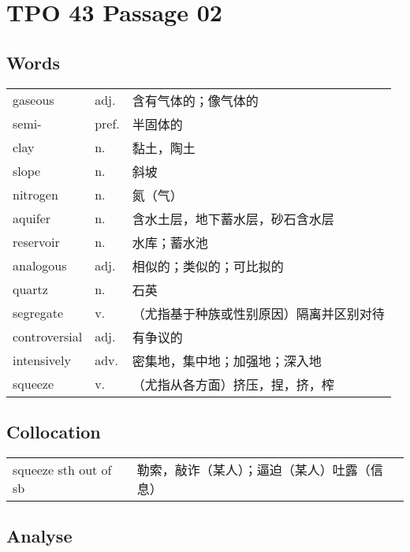 \section{TPO 43 Passage 02}

\subsection{Words}

\begin{tabular}{lll}
    gaseous       & adj.  & 含有气体的；像气体的           \\
    semi-         & pref. & 半固体的                 \\
    clay          & n.    & 黏土，陶土                \\
    slope         & n.    & 斜坡                   \\
    nitrogen      & n.    & 氮（气）                 \\
    aquifer       & n.    & 含水土层，地下蓄水层，砂石含水层     \\
    reservoir     & n.    & 水库；蓄水池               \\
    analogous     & adj.  & 相似的；类似的；可比拟的         \\
    quartz        & n.    & 石英                   \\
    segregate     & v.    & （尤指基于种族或性别原因）隔离并区别对待 \\
    controversial & adj.  & 有争议的                 \\
    intensively   & adv.  & 密集地，集中地；加强地；深入地      \\
    squeeze       & v.    & （尤指从各方面）挤压，捏，挤，榨     \\
\end{tabular}

\subsection{Collocation}

\begin{tabular}{ll}
    squeeze sth out of sb & 勒索，敲诈（某人）；逼迫（某人）吐露（信息） \\
\end{tabular}

\subsection{Analyse}

